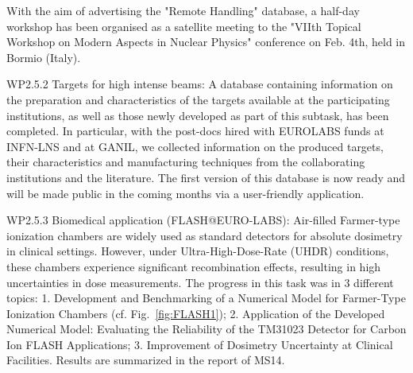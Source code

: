 With the aim of advertising the "Remote Handling" database, a half-day workshop has been organised as a satellite meeting to the "VIIth Topical Workshop on Modern Aspects in Nuclear Physics" conference on Feb. 4th, held in Bormio (Italy). 


WP2.5.2 Targets for high intense beams: A database containing information on the preparation and characteristics of the targets available at the participating institutions, as well as those newly developed as part of this subtask, has been completed. In particular, with the post-docs hired with EUROLABS funds at INFN-LNS and at GANIL, we collected information on the produced targets, their characteristics and manufacturing techniques from the collaborating institutions and the literature. The first version of this database is now ready and will be made public in the coming months via a user-friendly application.

WP2.5.3 Biomedical application (FLASH@EURO-LABS): Air-filled Farmer-type ionization chambers are widely used as standard detectors for absolute dosimetry in clinical settings. However, under Ultra-High-Dose-Rate (UHDR) conditions, these chambers experience significant recombination effects, resulting in high uncertainties in dose measurements.
The progress in this task was in 3 different topics: 1. Development and Benchmarking of a Numerical Model for Farmer-Type Ionization Chambers (cf. Fig.~\ref{fig:FLASH1}); 2. Application of the Developed Numerical Model: Evaluating the Reliability of the TM31023 Detector for Carbon Ion FLASH Applications; 3. Improvement of Dosimetry Uncertainty at Clinical Facilities. Results are summarized in the report of MS14.


